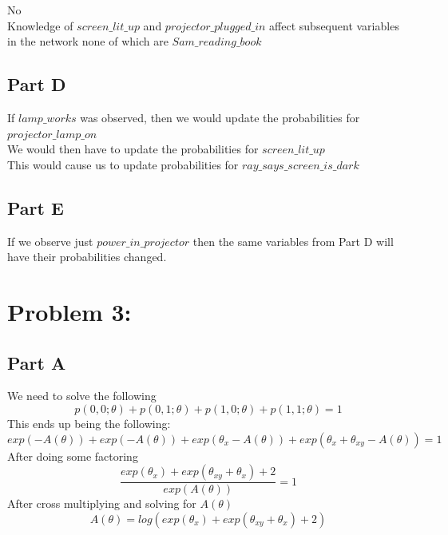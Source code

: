 \documentclass[twoside,11pt]{article}
\theoremstyle{definition}
\begin{document}
No\\
Knowledge of $\textit{screen\_lit\_up}$ and $\textit{projector\_plugged\_in}$ affect subsequent variables in the network none of which are $\textit{Sam\_reading\_book}$

\subsection*{Part D}

If $\textit{lamp\_works}$ was observed, then we would update the probabilities for $\textit{projector\_lamp\_on}$\\
We would then have to update the probabilities for $\textit{screen\_lit\_up}$\\
This would cause us to update probabilities for $\textit{ray\_says\_screen\_is\_dark}$

\subsection*{Part E}

If we observe just $\textit{power\_in\_projector}$ then the same variables from Part D will have their probabilities changed.

\section*{Problem 3: }

\subsection*{Part A}

We need to solve the following
\[
p(0,0;\theta) + p(0,1;\theta) + p(1,0;\theta) + p(1,1;\theta) = 1
\]
This ends up being the following:
\[
exp(-A(\theta)) + exp(-A(\theta)) + exp(\theta_x - A(\theta)) + exp(\theta_x + \theta_{xy} - A(\theta)) = 1
\]
After doing some factoring
\[
\frac{exp(\theta_x) + exp(\theta_{xy} + \theta_x) + 2}{exp(A(\theta))} = 1
\]
After cross multiplying and solving for $A(\theta)$
\[
A(\theta) = log( exp(\theta_x) + exp(\theta_{xy} + \theta_x) + 2 )
\]
\end{document}

